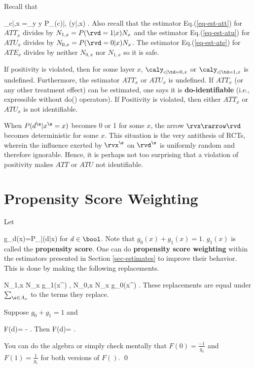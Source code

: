 Recall that

\beq
\caly_{c|\td ,x}
=\sum_{y} y P_{\rvy(c)|\rvtd, \rvx}(y|\td,x)
\;.
\eeq
Also recall
that the estimator
Eq.(\ref{eq-est-att})
for $ATT_x$ divides by $N_{1,x}=P(\rvd=1|x)N_x$
and
the estimator
Eq.(\ref{eq-est-atu})
for $ATU_x$ divides by $N_{0,x}= P(\rvd=0|x)N_x$.
The estimator Eq.(\ref{eq-est-ate})
for $ATE_x$ divides by neither $N_{0,x}$
nor $N_{1,x}$ so it is safe.

If positivity is violated,
then
for some
layer $x$,
 $\caly_{c|\td =0,x}$ or $\caly_{c|\td =1,x}$
is undefined.
Furthermore,  the estimator
$ATT_x$ or $ATU_x$ is undefined.
If $ATT_x$ (or any
other treatment effect)  can be estimated,
one says it is {\bf do-identifiable} (i.e.,
expressible without do() operators).
If Positivity is violated, then
either $ATT_x$ or $ATU_x$ is not identifiable.



When
$P(d^\s|x^\s=x)$
becomes 0 or 1 for some $x$,
the arrow
$\rvx\rarrow\rvd$
becomes deterministic
for some $x$.
This situation
is
the very
antithesis
of RCTs,
wherein
the influence
exerted by $\rvx^\s$ on
$\rvd^\s$ is uniformly
random and therefore ignorable.
Hence, it is perhaps
not too surprising
that a violation
of positivity makes
$ATT$ or $ATU$
not identifiable.

\section{Propensity Score
Weighting}

Let

\beq
g_d(x)=P_{\rvd|\rvx}(d|x)
\eeq
 for $d\in\bool$.
Note that $g_0(x)+g_1(x)=1$.
$g_1(x)$ is called the {\bf propensity score}.
One can do {\bf propensity score weighting}
within the estimators
presented in Section
\ref{sec-estimates} to
improve their behavior.
This is done by making the
following replacements.

\beq
N_{1,x}
\rarrow
N_x g_1(x^\s)
\;,\;\;
N_{0,x}
\rarrow
N_x g_0(x^\s)
\;.
\eeq
These replacements are
equal under $ \sum_{\s\in A_x}$
to the terms they replace.

\begin{claim}
\label{cl-d-line}
Suppose $g_0+g_1=1$ and

\beq F(d)=
-
\;.
\eeq
Then
\beq
F(d)=
\;.
\eeq
\end{claim}
\proof
You can do the algebra
or simply check mentally that
$F(0)=\frac{-1}{g_0}$
and $F(1)=\frac{1}{g_1}$
for both versions of $F()$.
\qed


